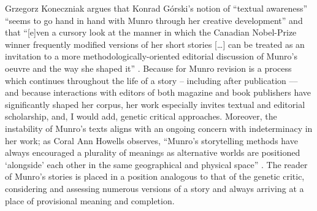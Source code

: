 \documentclass{article}
\begin{document}
Grzegorz Koneczniak argues that Konrad Górski's notion of ``textual
awareness'' ``seems to go hand in hand with Munro through her creative
development'' \citep[106]{koneczniak_works_2016} and that ``{[}e{]}ven a cursory look at the manner
in which the Canadian Nobel-Prize winner frequently modified versions of
her short stories {[}\ldots{]} can be treated as an invitation to a more
methodologically-oriented editorial discussion of Munro's oeuvre and the
way she shaped it'' \citep[105]{koneczniak_works_2016}. Because for Munro revision is a process which continues throughout the life of a story – including after publication –– and because interactions with editors of both magazine and
book publishers have significantly shaped her corpus, her work
especially invites textual and editorial scholarship, and, I would add,
genetic critical approaches. Moreover, the instability of Munro's texts
aligns with an ongoing concern with indeterminacy in her work; as Coral
Ann Howells observes, ``Munro's storytelling methods have always
encouraged a plurality of meanings as alternative worlds are positioned
`alongside' each other in the same geographical and physical space''
\citep[70]{howells_alice_1998}. The reader of Munro's stories is placed in a position analogous to
that of the genetic critic, considering and assessing numerous versions
of a story and always arriving at a place of provisional meaning and
completion.
\end{document}
